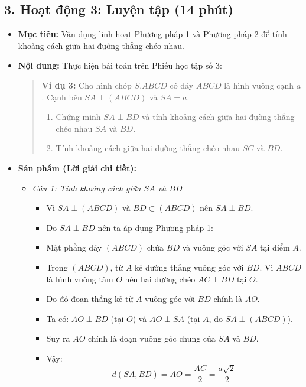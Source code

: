\documentclass[12pt, a4paper]{article}
\begin{document}
\subsection*{3. Hoạt động 3: Luyện tập (14 phút)}

\begin{itemize}[leftmargin=1.2cm]
    \item[a)] \textbf{Mục tiêu:} Vận dụng linh hoạt Phương pháp 1 và Phương pháp 2 để tính khoảng cách giữa hai đường thẳng chéo nhau.
    \item[b)] \textbf{Nội dung:} Thực hiện bài toán trên Phiếu học tập số 3:
    \begin{quote}
        \textbf{Ví dụ 3:} Cho hình chóp $S.ABCD$ có đáy $ABCD$ là hình vuông cạnh $a$. Cạnh bên $SA \perp (ABCD)$ và $SA = a$.
        \begin{enumerate}
            \item Chứng minh $SA \perp BD$ và tính khoảng cách giữa hai đường thẳng chéo nhau $SA$ và $BD$.
            \item Tính khoảng cách giữa hai đường thẳng chéo nhau $SC$ và $BD$.
        \end{enumerate}
    \end{quote}

    \item[c)] \textbf{Sản phẩm (Lời giải chi tiết):}
    \begin{itemize}[leftmargin=0.6cm]
        \item \textit{Câu 1: Tính khoảng cách giữa $SA$ và $BD$}
        \begin{itemize}
            \item Vì $SA \perp (ABCD)$ và $BD \subset (ABCD)$ nên $SA \perp BD$.
            \item Do $SA \perp BD$ nên ta áp dụng Phương pháp 1:
            \item Mặt phẳng đáy $(ABCD)$ chứa $BD$ và vuông góc với $SA$ tại điểm $A$.
            \item Trong $(ABCD)$, từ $A$ kẻ đường thẳng vuông góc với $BD$. Vì $ABCD$ là hình vuông tâm $O$ nên hai đường chéo $AC \perp BD$ tại $O$.
            \item Do đó đoạn thẳng kẻ từ $A$ vuông góc với $BD$ chính là $AO$.
            \item Ta có: $AO \perp BD$ (tại $O$) và $AO \perp SA$ (tại $A$, do $SA \perp (ABCD)$).
            \item Suy ra $AO$ chính là đoạn vuông góc chung của $SA$ và $BD$.
            \item Vậy:
            $$d(SA, BD) = AO = \dfrac{AC}{2} = \dfrac{a\sqrt{2}}{2}$$
        \end{itemize}


\end{itemize}
\end{itemize}
\end{document}
